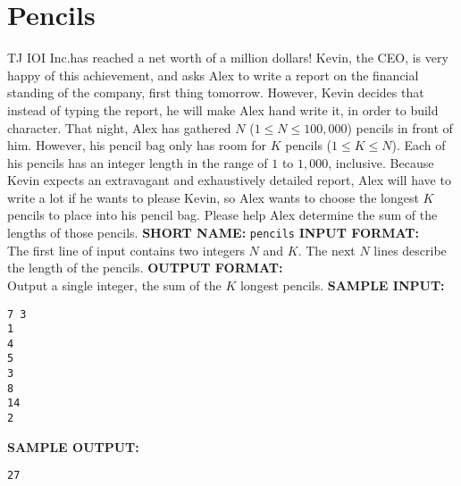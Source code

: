 \section{Pencils}

TJ IOI Inc.\@ has reached a net worth of a million dollars! Kevin, the CEO, is very happy of this achievement, and asks Alex to write a report on the financial standing of the company, first thing tomorrow.  However, Kevin decides that instead of typing the report, he will make Alex hand write it, in order to build character.
\blank
That night, Alex has gathered $ N $ ($ 1 \leq N \leq 100,000 $) pencils in front of him. However, his pencil bag only has room for $ K $ pencils ($ 1 \leq K \leq N $). Each of his pencils has an integer length in the range of $ 1 $ to $ 1,000 $, inclusive. Because Kevin expects an extravagant and exhaustively detailed report, Alex will have to write a lot if he wants to please Kevin, so Alex wants to choose the longest $ K $ pencils to place into his pencil bag.  Please help Alex determine the sum of the lengths of those pencils.
\blank
\textbf{SHORT NAME:} \verb|pencils|
\blank
\textbf{INPUT FORMAT:}\\
The first line of input contains two integers $ N $ and $ K $. The next $ N $ lines describe the length of the pencils.
\blank
\textbf{OUTPUT FORMAT:}\\
Output a single integer, the sum of the $ K $ longest pencils.
\blank
\textbf{SAMPLE INPUT:}
\begin{verbatim}
7 3
1 
4 
5 
3 
8 
14 
2
\end{verbatim}
\textbf{SAMPLE OUTPUT:}
\begin{verbatim}
27
\end{verbatim}

